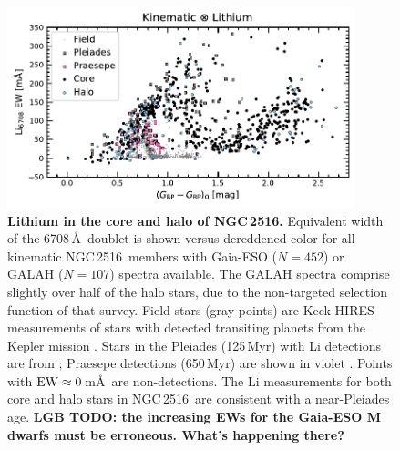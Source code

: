 \documentclass[12pt,twocolumn,tighten]{aastex63}
\newcommand{\cn}{NGC\,2516} %
\begin{document}
\begin{figure}[t]
	\begin{center}
		\leavevmode
			\includegraphics[width=0.9\textwidth]{f5a.pdf}
	\end{center}
	\vspace{-0.7cm}
  \caption{ {\bf Lithium in the core and halo of NGC\,2516.}
  Equivalent width of the 6708\,\AA\ doublet is shown versus
  dereddened color for all kinematic \cn\ members with Gaia-ESO
  ($N=452$) or GALAH ($N=107$) spectra available.  The GALAH spectra
  comprise slightly over half of the halo stars, due to the
  non-targeted selection function of that survey.  Field stars (gray
  points) are Keck-HIRES measurements of stars with detected
  transiting planets from the Kepler mission
  \citep{berger_identifying_2018}.  Stars in the Pleiades (125\,Myr)
  with Li detections are from \citet{bouvier_pleiades_lirot_2018};
  Praesepe detections (650\,Myr) are shown in violet
  \citep{soderblom_praesepe_1993}.  Points with ${\rm
  EW}\approx0\,$m\AA\ are non-detections.
  The Li measurements for both core and halo stars in \cn\ are
  consistent with a near-Pleiades age.
  {\bf LGB TODO: the increasing EWs for the Gaia-ESO M dwarfs must be erroneous. What's happening there?}
  \label{fig:lithiumcorehalo}
  }
\end{figure}
\end{document}
